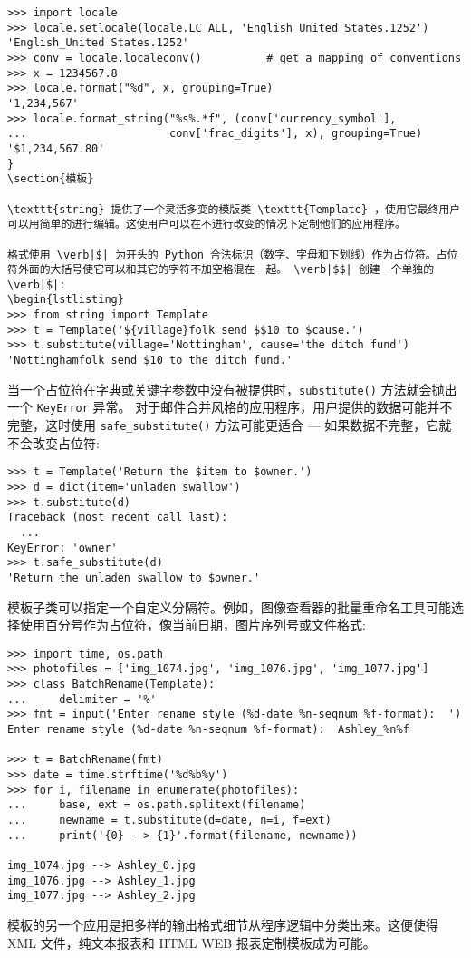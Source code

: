\begin{lstlisting}
>>> import locale
>>> locale.setlocale(locale.LC_ALL, 'English_United States.1252')
'English_United States.1252'
>>> conv = locale.localeconv()          # get a mapping of conventions
>>> x = 1234567.8
>>> locale.format("%d", x, grouping=True)
'1,234,567'
>>> locale.format_string("%s%.*f", (conv['currency_symbol'],
...                      conv['frac_digits'], x), grouping=True)
'$1,234,567.80'
}
\section{模板}

\texttt{string} 提供了一个灵活多变的模版类 \texttt{Template} ，使用它最终用户可以用简单的进行编辑。这使用户可以在不进行改变的情况下定制他们的应用程序。

格式使用 \verb|$| 为开头的 Python 合法标识（数字、字母和下划线）作为占位符。占位符外面的大括号使它可以和其它的字符不加空格混在一起。 \verb|$$| 创建一个单独的 \verb|$|:
\begin{lstlisting}
>>> from string import Template
>>> t = Template('${village}folk send $$10 to $cause.')
>>> t.substitute(village='Nottingham', cause='the ditch fund')
'Nottinghamfolk send $10 to the ditch fund.'
\end{lstlisting}

当一个占位符在字典或关键字参数中没有被提供时，\texttt{substitute()} 方法就会抛出一个 \texttt{KeyError} 异常。 对于邮件合并风格的应用程序，用户提供的数据可能并不完整，这时使用 \texttt{safe\_substitute()} 方法可能更适合 — 如果数据不完整，它就不会改变占位符:
\begin{lstlisting}
>>> t = Template('Return the $item to $owner.')
>>> d = dict(item='unladen swallow')
>>> t.substitute(d)
Traceback (most recent call last):
  ...
KeyError: 'owner'
>>> t.safe_substitute(d)
'Return the unladen swallow to $owner.'
\end{lstlisting}

模板子类可以指定一个自定义分隔符。例如，图像查看器的批量重命名工具可能选择使用百分号作为占位符，像当前日期，图片序列号或文件格式:
\begin{lstlisting}
>>> import time, os.path
>>> photofiles = ['img_1074.jpg', 'img_1076.jpg', 'img_1077.jpg']
>>> class BatchRename(Template):
...     delimiter = '%'
>>> fmt = input('Enter rename style (%d-date %n-seqnum %f-format):  ')
Enter rename style (%d-date %n-seqnum %f-format):  Ashley_%n%f

>>> t = BatchRename(fmt)
>>> date = time.strftime('%d%b%y')
>>> for i, filename in enumerate(photofiles):
...     base, ext = os.path.splitext(filename)
...     newname = t.substitute(d=date, n=i, f=ext)
...     print('{0} --> {1}'.format(filename, newname))

img_1074.jpg --> Ashley_0.jpg
img_1076.jpg --> Ashley_1.jpg
img_1077.jpg --> Ashley_2.jpg
\end{lstlisting}
模板的另一个应用是把多样的输出格式细节从程序逻辑中分类出来。这便使得 XML 文件，纯文本报表和 HTML WEB 报表定制模板成为可能。
